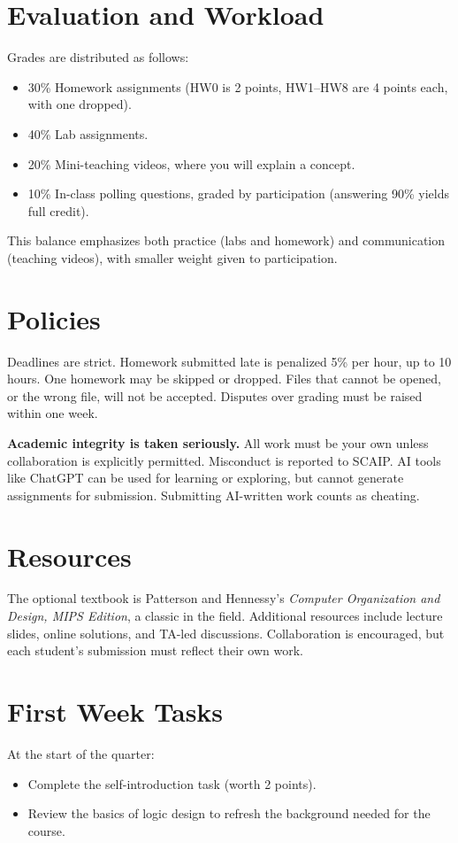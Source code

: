 \documentclass[11pt]{article}
\begin{document}
\section*{Evaluation and Workload}
Grades are distributed as follows:
\begin{itemize}
  \item 30\% Homework assignments (HW0 is 2 points, HW1--HW8 are 4 points each, with one dropped).
  \item 40\% Lab assignments.
  \item 20\% Mini-teaching videos, where you will explain a concept.
  \item 10\% In-class polling questions, graded by participation (answering 90\% yields full credit).
\end{itemize}

This balance emphasizes both practice (labs and homework) and communication (teaching videos), with smaller weight given to participation.

\section*{Policies}
Deadlines are strict. Homework submitted late is penalized 5\% per hour, up to 10 hours. One homework may be skipped or dropped. Files that cannot be opened, or the wrong file, will not be accepted. Disputes over grading must be raised within one week.

\textbf{Academic integrity is taken seriously.} All work must be your own unless collaboration is explicitly permitted. Misconduct is reported to SCAIP. AI tools like ChatGPT can be used for learning or exploring, but cannot generate assignments for submission. Submitting AI-written work counts as cheating.

\section*{Resources}
The optional textbook is Patterson and Hennessy’s \emph{Computer Organization and Design, MIPS Edition}, a classic in the field. Additional resources include lecture slides, online solutions, and TA-led discussions. Collaboration is encouraged, but each student’s submission must reflect their own work.

\section*{First Week Tasks}
At the start of the quarter:
\begin{itemize}
  \item Complete the self-introduction task (worth 2 points).
  \item Review the basics of logic design to refresh the background needed for the course.
\end{itemize}
\end{document}
